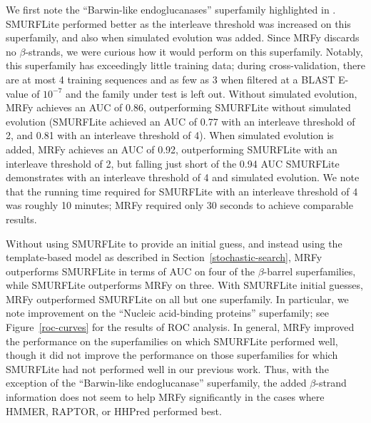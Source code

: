\documentclass[blockstyle,times,preprint]{sigplanconf}
\begin{document}
We first note the ``Barwin-like endoglucanases'' superfamily highlighted in
\citet{Daniels:2012dg}.
SMURFLite performed better as the interleave threshold was increased on this
superfamily, and also when simulated evolution was added.
Since MRFy discards no $\beta$-strands, we were curious how it would perform
on this superfamily.
Notably, this superfamily has exceedingly little training data; during 
cross-validation, there are at most 4 training sequences and as few as 3
when filtered at a BLAST E-value of $10^{-7}$ and the family under test is left
out.
Without simulated evolution, MRFy achieves an AUC of 0.86, outperforming 
SMURFLite
without simulated evolution (SMURFLite achieved an AUC of 0.77 with an 
interleave threshold of 2, and 0.81 with an interleave threshold of 4).
When simulated evolution is added, MRFy achieves an AUC of 0.92, outperforming
SMURFLite with an interleave threshold of 2, but falling just short of the 0.94
AUC SMURFLite demonstrates with an interleave threshold of 4 and simulated 
evolution.
We note that the running time required for SMURFLite with an interleave
threshold of 4 was roughly 10 minutes; MRFy required only 30 seconds to achieve
comparable results.

Without using SMURFLite to provide an initial guess, and instead using the
template-based model as described in Section~\ref{stochastic-search}, MRFy 
outperforms SMURFLite in terms of AUC on four of the $\beta$-barrel 
superfamilies, while SMURFLite outperforms MRFy on three.
With SMURFLite initial guesses, MRFy outperformed SMURFLite on all but one
superfamily.
In particular, we note improvement on the ``Nucleic acid-binding proteins''
superfamily; see Figure~\ref{roc-curves} for the results of ROC analysis.
In general, MRFy improved the performance on the superfamilies on which
SMURFLite performed well, though it did not improve the performance on those
superfamilies for which 
SMURFLite had not performed well in our previous work.
Thus, with the exception of the ``Barwin-like endoglucanase'' superfamily, the
added $\beta$-strand information does not seem to help MRFy significantly in 
the cases where HMMER, RAPTOR, or HHPred performed best.
\end{document}
